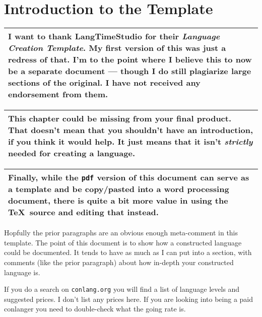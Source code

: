 
\chapter{Introduction to the Template}

\begin{center}
\begin{tabular}{|p{}|}
\hline
I want to thank LangTimeStudio for their \textsl{Language Creation Template}.
My first version of this was just a redress of that.
I'm to the point where I believe this to now be a separate document --- though I do still
plagiarize large sections of the original.
I have not received any endorsement from them.
\\\hline
\end{tabular}

\vskip 5mm

\begin{tabular}{|p{}|}
\hline
This chapter could be missing from your final product.
That doesn't mean that you shouldn't have an introduction, if you think it would help.
It just means that it isn't \emph{strictly} needed for creating a language.
\\\hline
\end{tabular}
\vskip 5mm

\begin{tabular}{|p{}|}
\hline
Finally, while the \texttt{pdf} version of this document can serve as a template and be
copy/pasted into a word processing document, there is quite a bit more value in using the
\TeX\ source and editing that instead.
\\\hline
\end{tabular}
\end{center}

Hopfully the prior paragraphs are an obvious enough meta-comment in this template.
The point of this document is to show how a constructed language could be documented.
It tends to have as much as I can put into a section, with comments (like the prior paragraph)
about how in-depth your constructed language is.

If you do a search on \texttt{conlang.org} you will find a list of language levels and suggested
prices.
I don't list any prices here.
If you are looking into being a paid conlanger you need to double-check what the going rate is.

